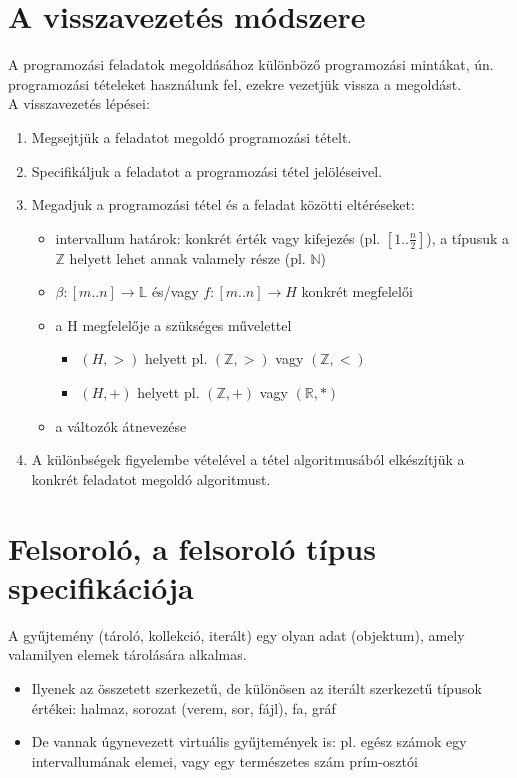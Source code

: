 \documentclass[12pt,margin=0px]{article}
\begin{document}
	\section*{A visszavezetés módszere}
	
	A programozási feladatok megoldásához különböző programozási mintákat, ún. programozási tételeket használunk fel, ezekre vezetjük vissza
	a megoldást.\\

	\noindent A visszavezetés lépései:
	\begin{enumerate}
		\item	Megsejtjük a feladatot megoldó programozási tételt.
		\item	Specifikáljuk a feladatot a programozási tétel jelöléseivel.
		\item	Megadjuk a programozási tétel és a feladat közötti eltéréseket:
			\begin{itemize}
				\item	intervallum határok: konkrét érték vagy kifejezés (pl. $[1..\frac{n}{2}]$),
				a típusuk a $\mathbb{Z}$ helyett lehet annak valamely része (pl. $\mathbb{N}$)
				
				\item	$\beta:[m..n] \to \mathbb{L}$ és/vagy $f:[m..n] \to H$ konkrét megfelelői
				
				\item	a H megfelelője a szükséges művelettel
					\begin{itemize}
						\item	$(H,>)$ helyett pl. $(\mathbb{Z},>)$ vagy $(\mathbb{Z},<)$
						\item	$(H,+)$ helyett pl. $(\mathbb{Z},+)$ vagy $(\mathbb{R},*)$
					\end{itemize}
				\item	a változók átnevezése
			\end{itemize}
		\item	A különbségek figyelembe vételével a tétel algoritmusából elkészítjük a konkrét feladatot megoldó algoritmust.
	\end{enumerate}
	
	\section*{Felsoroló, a felsoroló típus specifikációja}
	
	A gyűjtemény (tároló, kollekció, iterált) egy olyan adat (objektum), amely valamilyen elemek tárolására alkalmas.
	\begin{itemize}
		\item	Ilyenek az összetett szerkezetű, de különösen az iterált szerkezetű	típusok értékei: halmaz, sorozat (verem, sor, fájl), fa, gráf

		\item	De vannak úgynevezett virtuális gyűjtemények is: pl. egész számok
		egy intervallumának elemei, vagy egy természetes szám prím-osztói
	\end{itemize}
	
\end{document}
